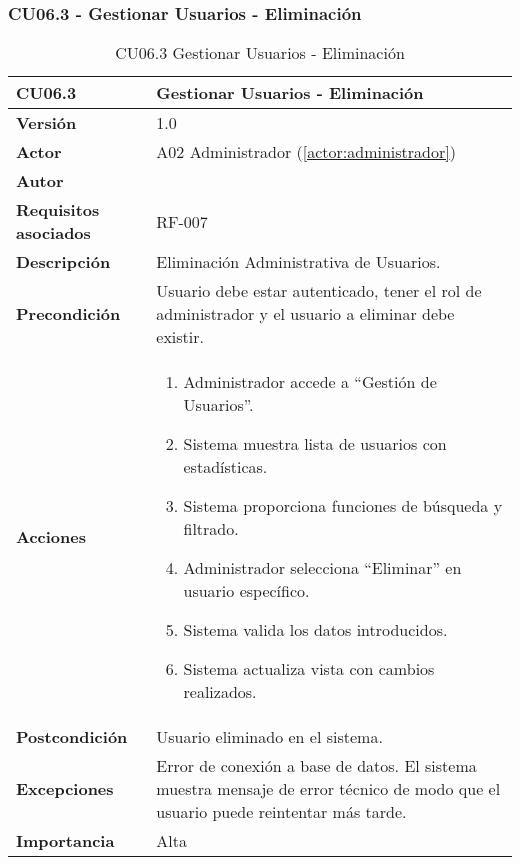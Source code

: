 \subsubsection{CU06.3 - Gestionar Usuarios - Eliminación}

\begin{table}[H]
	\centering
	\begin{tabularx}{\linewidth}{ p{} p{} }
		\toprule
		\textbf{CU06.3}    & \textbf{Gestionar Usuarios - Eliminación} \\
		\toprule
		\textbf{Versión}              & 1.0    \\
		\textbf{Actor}                & A02 Administrador (\ref{actor:administrador}) \\
		\textbf{Autor}                & \nombre \\
		\textbf{Requisitos asociados} & RF-007 \\
		\textbf{Descripción}          & Eliminación Administrativa de Usuarios. \\
		\textbf{Precondición}         & Usuario debe estar autenticado, tener el rol de administrador y el usuario a eliminar debe existir. \\
		\textbf{Acciones}             &
		\begin{enumerate}
			\def\labelenumi{\arabic{enumi}.}
			\tightlist
			\item Administrador accede a ``Gestión de Usuarios''.
            \item Sistema muestra lista de usuarios con estadísticas.
            \item Sistema proporciona funciones de búsqueda y filtrado.
            \item Administrador selecciona ``Eliminar'' en usuario específico.
            \item Sistema valida los datos introducidos.
            \item Sistema actualiza vista con cambios realizados.
		\end{enumerate}\\
		\textbf{Postcondición}        & Usuario eliminado en el sistema.\\
		\textbf{Excepciones}          & Error de conexión a base de datos. El sistema muestra mensaje de error técnico de modo que el usuario puede reintentar más tarde.\\
		\textbf{Importancia}          & Alta \\
		\bottomrule
	\end{tabularx}
	\caption{CU06.3 Gestionar Usuarios - Eliminación}
	\label{cu:gestionar-usuarios-eliminacion}
\end{table}

